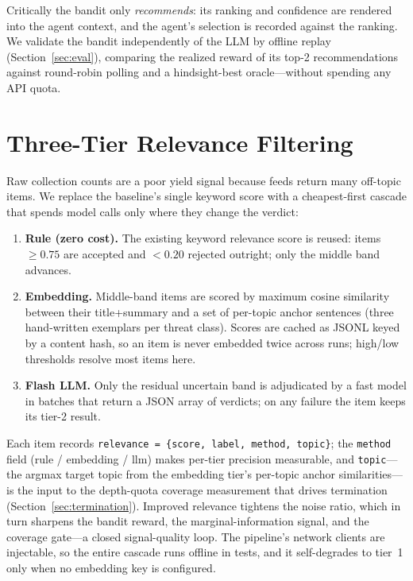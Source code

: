 \documentclass[conference]{IEEEtran}
\newcommand{\code}[1]{\texttt{\small #1}}
\begin{document}
Critically the bandit only \emph{recommends}: its ranking and confidence are rendered into the agent context, and the agent's selection is recorded against the ranking. We validate the bandit independently of the LLM by offline replay (Section~\ref{sec:eval}), comparing the realized reward of its top-2 recommendations against round-robin polling and a hindsight-best oracle---without spending any API quota.

\section{Three-Tier Relevance Filtering}
\label{sec:relevance}

Raw collection counts are a poor yield signal because feeds return many off-topic items. We replace the baseline's single keyword score with a cheapest-first cascade that spends model calls only where they change the verdict:

\begin{enumerate}
  \item \textbf{Rule (zero cost).} The existing keyword relevance score is reused: items $\ge 0.75$ are accepted and $< 0.20$ rejected outright; only the middle band advances.
  \item \textbf{Embedding.} Middle-band items are scored by maximum cosine similarity between their title+summary and a set of per-topic anchor sentences (three hand-written exemplars per threat class). Scores are cached as JSONL keyed by a content hash, so an item is never embedded twice across runs; high/low thresholds resolve most items here.
  \item \textbf{Flash LLM.} Only the residual uncertain band is adjudicated by a fast model in batches that return a JSON array of verdicts; on any failure the item keeps its tier-2 result.
\end{enumerate}

Each item records \code{relevance = \{score, label, method, topic\}}; the \code{method} field (rule / embedding / llm) makes per-tier precision measurable, and \code{topic}---the argmax target topic from the embedding tier's per-topic anchor similarities---is the input to the depth-quota coverage measurement that drives termination (Section~\ref{sec:termination}). Improved relevance tightens the noise ratio, which in turn sharpens the bandit reward, the marginal-information signal, and the coverage gate---a closed signal-quality loop. The pipeline's network clients are injectable, so the entire cascade runs offline in tests, and it self-degrades to tier~1 only when no embedding key is configured.
\end{document}
